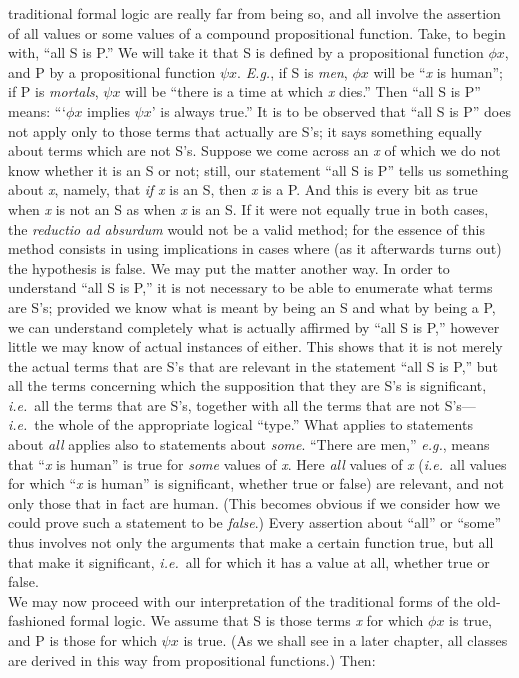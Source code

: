{traditional formal
logic are
really far from being so, and all involve the assertion of all values
or some values of a compound propositional function. Take, to begin
with, ``all S is P.'' We
will take it that S is
defined by
a propositional function $\phi x$,
and P by a propositional
function $\psi x$.
\textit{E.g.},
if S is \textit{men}, $\phi x$ will be ``\textit{x} is human''; if
P is \textit{mortals}, $\psi x$ will be ``there is
a time at which \textit{x}
dies.'' Then ``all
S is P'' means: ```$\phi x$ implies $\psi x$' is always true.''
It
is to be observed that ``all S is P'' does not apply only to those terms
that actually are S's; it says something equally about terms which are
not S's. Suppose we come across an \textit{x}
of which we do not know whether it
is an S or not; still, our statement ``all S is P'' tells us something
about \textit{x},
namely, that \textit{if}
\textit{x} is
an S,
then \textit{x} is
a P. And this is every
bit as true when \textit{x}
is not an S as when \textit{x}
is an S. If it were not
equally true in both cases, the \textit{reductio
ad absurdum} would not be a
valid method; for the essence of this method consists in using
implications in cases where (as it afterwards turns out) the hypothesis
is false. We may put the matter another way. In order to understand
``all S is P,'' it is not necessary to be able to enumerate what terms
are S's; provided we know what is meant by being an S and what by \aftonly{\enlargethispage{\baselineskip}}being
a P, we can understand completely what is actually 
affirmed   by ``all S
is P,'' however little we may know of actual instances of either. This
shows that it is not merely the actual terms that are S's that are
relevant in the statement ``all S is P,'' but all the terms concerning
which the supposition that they are S's is significant, \textit{i.e.}\ all the
terms that are S's, together with all the terms that are not S's---\textit{i.e.}\ the whole of the appropriate logical ``type.'' What applies to statements
about \textit{all}
applies also to statements about \textit{some}.
``There are men,'' \textit{e.g.},
means that ``\textit{x}
is human'' is true for \textit{some}
values of \textit{x}.
Here \textit{all}
values
of \textit{x} (\textit{i.e.}\ all values for which ``\textit{x}
is human'' is significant, whether
true or false) are relevant, and not only those that in fact are human.
(This becomes obvious if we consider how we could prove such a
statement to be \textit{false}.)
Every assertion about ``all'' or ``some'' thus
involves not only the arguments that make a certain function true, but
all that make it significant, \textit{i.e.}\ all for which it has a value at all,
whether true or false.\\
\indent We may now proceed with our
interpretation of the
traditional
forms of
the old-fashioned formal logic. We assume that S is those terms \textit{x} for
which $\phi x$
is true, and P is those for which $\psi x$ is true. (As we
shall see
in a later chapter, all classes are derived in this way from
propositional functions.) Then:}
